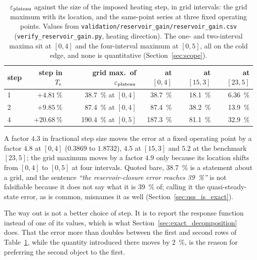 \begin{table}[htbp]
\centering
\caption{$\varepsilon_{\mathrm{plateau}}$ against the size of the imposed heating step, in grid
intervals: the grid maximum with its location, and the same-point series at
three fixed operating points. Values from
\texttt{validation/reservoir\_gain/reservoir\_gain.csv}
(\texttt{verify\_reservoir\_gain.py}, heating direction). The one- and
two-interval maxima sit at $[0,4]$ and the four-interval maximum at $[0,5]$,
all on the cold edge, and none is quantitative (Section~\ref{sec:scope}).}
\label{tab:step_dependence}
\begin{tabular}{lrrrrr}
  \toprule
  step & step in $T_e$ & grid max.\ of $\varepsilon_{\mathrm{plateau}}$ & at $[0,4]$ & at $[15,3]$ & at $[23,5]$ \\
  \midrule
  1 & $+\SI{4.81}{\percent}$  & \SI{38.7}{\percent} at $[0,4]$  & \SI{38.7}{\percent}  & \SI{18.1}{\percent} & \SI{6.36}{\percent} \\
  2 & $+\SI{9.85}{\percent}$  & \SI{87.4}{\percent} at $[0,4]$  & \SI{87.4}{\percent}  & \SI{38.2}{\percent} & \SI{13.9}{\percent} \\
  4 & $+\SI{20.68}{\percent}$ & \SI{190.4}{\percent} at $[0,5]$ & \SI{187.3}{\percent} & \SI{81.1}{\percent} & \SI{32.9}{\percent} \\
  \bottomrule
\end{tabular}
\end{table}

A factor $4.3$ in fractional step size moves the error at a fixed operating
point by a factor $4.8$ at $[0,4]$ ($0.3869$ to $1.8732$), $4.5$ at $[15,3]$
and $5.2$ at the benchmark $[23,5]$; the grid maximum moves by a factor $4.9$
only because its location shifts from $[0,4]$ to $[0,5]$ at four intervals. Quoted
bare, \SI{38.7}{\percent} is a statement about a grid, and the sentence
\emph{``the reservoir-closure error reaches \SI{39}{\percent}''} is not
falsifiable because it does not say what it is \SI{39}{\percent} of; calling
it the quasi-steady-state error, as is common, misnames it as well
(Section~\ref{sec:qss_is_exact}).

The way out is not a better choice of step. It is to report the response
function instead of one of its values, which is what
Section~\ref{sec:exact_decomposition} does. That the error more than doubles
between the first and second rows of Table~\ref{tab:step_dependence}, while the
quantity introduced there moves by \SI{2}{\percent}, is the reason for
preferring the second object to the first.

